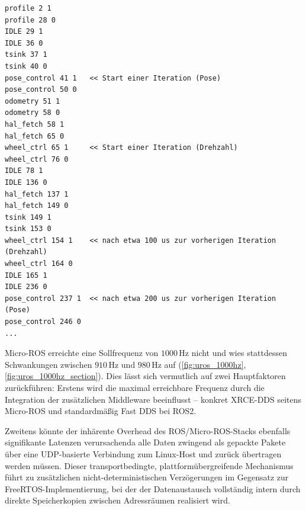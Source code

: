 \begin{code}
\begin{verbatim}
profile 2 1
profile 28 0
IDLE 29 1
IDLE 36 0
tsink 37 1
tsink 40 0
pose_control 41 1   << Start einer Iteration (Pose)
pose_control 50 0
odometry 51 1
odometry 58 0
hal_fetch 58 1
hal_fetch 65 0
wheel_ctrl 65 1     << Start einer Iteration (Drehzahl)
wheel_ctrl 76 0
IDLE 78 1
IDLE 136 0
hal_fetch 137 1
hal_fetch 149 0
tsink 149 1
tsink 153 0
wheel_ctrl 154 1    << nach etwa 100 us zur vorherigen Iteration (Drehzahl)
wheel_ctrl 164 0
IDLE 165 1
IDLE 236 0
pose_control 237 1  << nach etwa 200 us zur vorherigen Iteration (Pose)
pose_control 246 0
...
\end{verbatim}
    \label{code:freertos_data_10000hz}
\end{code}

Micro-ROS erreichte eine Sollfrequenz von $1000\,\text{Hz}$ nicht und wies
stattdessen Schwankungen zwischen $910\,\text{Hz}$ und $980\,\text{Hz}$ auf
(\ref{fig:uros_1000hz}, \ref{fig:uros_1000hz_section}). Dies lässt sich
vermutlich auf zwei Hauptfaktoren zurückführen: Erstens wird die maximal
erreichbare Frequenz durch die Integration der zusätzlichen Middleware
beeinflusst \cite{ROS_Performance2019} -- konkret \ac{XRCE}-DDS seitens
Micro-ROS und standardmäßig Fast DDS bei ROS2.

Zweitens könnte der inhärente Overhead des ROS/Micro-ROS-Stacks ebenfalls
signifikante Latenzen verursachenda alle Daten zwingend als gepackte Pakete über
eine UDP-basierte Verbindung zum Linux-Host und zurück übertragen werden müssen.
Dieser transportbedingte, plattformübergreifende Mechanismus führt zu
zusätzlichen nicht-deterministischen Verzögerungen im Gegensatz zur
FreeRTOS-Implementierung, bei der der Datenaustausch vollständig intern durch
direkte Speicherkopien zwischen Adressräumen realisiert wird.

